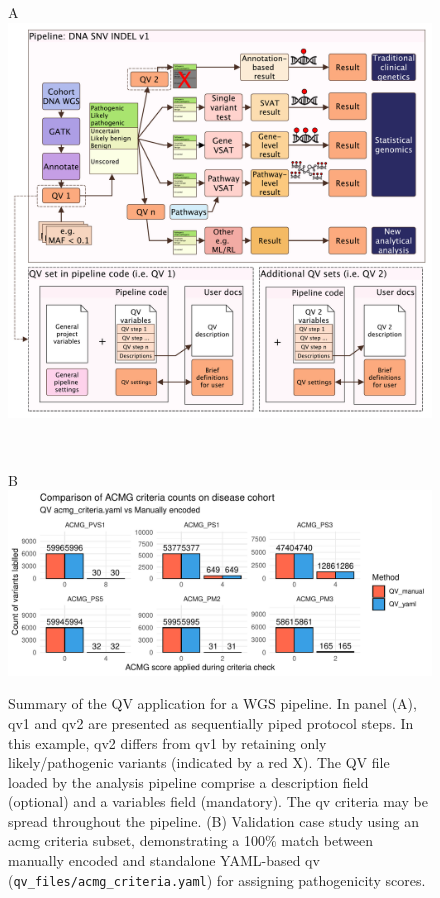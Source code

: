 \begin{figure}[!h]
\centering
\begin{minipage}{0.85\textwidth}
\raggedright A\\[0.5ex]
\includegraphics[width=\textwidth]{./images/qv_pipeline_with_file_vcurrent.pdf}
\end{minipage}\\[-2ex]
\begin{minipage}{0.9\textwidth}
\raggedright B\\[0.5ex]
\includegraphics[width=\textwidth]{./images/Guru_singlecase_validation_of_yaml_vs_manual.pdf}
\end{minipage}
    \caption{Summary of the QV application for a WGS pipeline. In panel (A), \ac{qv}1 and \ac{qv}2 are presented as sequentially piped protocol steps. In this example, \ac{qv}2 differs from \ac{qv}1 by retaining only likely/pathogenic variants (indicated by a red X). The QV file loaded by the analysis pipeline comprise a description field (optional) and a variables field (mandatory). The \ac{qv} criteria may be spread throughout the pipeline.
    (B) Validation case study using an \ac{acmg} criteria subset, demonstrating a 100\% match between manually encoded and standalone YAML-based \ac{qv} (\texttt{qv\_files/acmg\_criteria.yaml}) for assigning pathogenicity scores.}
    \label{fig:qv_pipeline_with_file_vcurrent_guru_case_study_result}
\end{figure}

